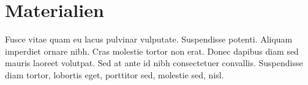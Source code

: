\label{sec:anhang}

\section{Materialien} 
\label{sec:materialien}
Fusce vitae quam eu lacus pulvinar vulputate. Suspendisse potenti. Aliquam imperdiet ornare nibh. Cras molestie tortor non erat. Donec dapibus diam sed mauris laoreet volutpat. Sed at ante id nibh consectetuer convallis. Suspendisse diam tortor, lobortis eget, porttitor sed, molestie sed, nisl.